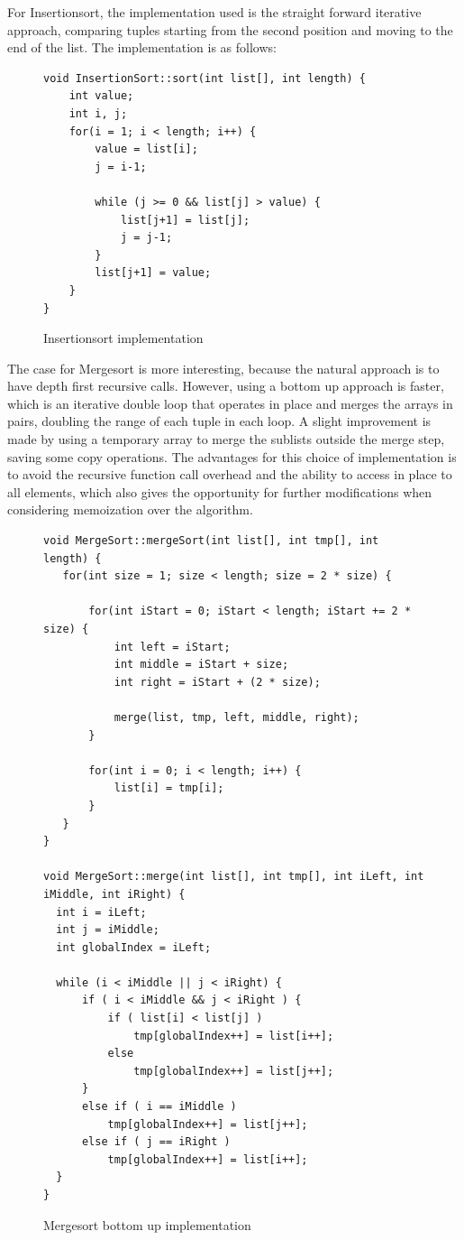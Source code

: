 \documentclass[a4paper,12pt]{article}
\begin{document}
For Insertionsort, the implementation used is the straight forward iterative approach, comparing tuples starting from the second position and moving to the end of the list. The implementation is as follows:

\begin{figure}[H]
\begin{small}
\begin{verbatim}
void InsertionSort::sort(int list[], int length) {
    int value;
    int i, j;
    for(i = 1; i < length; i++) {
        value = list[i];
        j = i-1;
        
        while (j >= 0 && list[j] > value) {
            list[j+1] = list[j];
            j = j-1;
        }
        list[j+1] = value;
    }
}
\end{verbatim}
\end{small}
\caption{Insertionsort implementation}
\end{figure}


The case for Mergesort is more interesting, because the natural approach is to have depth first recursive calls. However, using a bottom up approach is faster, which is an iterative double loop that operates in place and merges the arrays in pairs, doubling the range of each tuple in each loop. A slight improvement is made by using a temporary array to merge the sublists outside the merge step, saving some copy operations. The advantages for this choice of implementation is to avoid the recursive function call overhead and the ability to access in place to all elements, which also gives the opportunity for further modifications when considering memoization over the algorithm.

\begin{figure}[H]
\begin{small}
\begin{verbatim}
void MergeSort::mergeSort(int list[], int tmp[], int length) {
   for(int size = 1; size < length; size = 2 * size) { 

       for(int iStart = 0; iStart < length; iStart += 2 * size) {
           int left = iStart;
           int middle = iStart + size;
           int right = iStart + (2 * size);

           merge(list, tmp, left, middle, right);
       }
       
       for(int i = 0; i < length; i++) {
           list[i] = tmp[i];
       }
   }
}

void MergeSort::merge(int list[], int tmp[], int iLeft, int iMiddle, int iRight) {
  int i = iLeft;
  int j = iMiddle;
  int globalIndex = iLeft;

  while (i < iMiddle || j < iRight) {
      if ( i < iMiddle && j < iRight ) {
          if ( list[i] < list[j] )
              tmp[globalIndex++] = list[i++];
          else
              tmp[globalIndex++] = list[j++];
      }
      else if ( i == iMiddle )
          tmp[globalIndex++] = list[j++];
      else if ( j == iRight )
          tmp[globalIndex++] = list[i++];
  }
}
\end{verbatim}
\end{small}
\caption{Mergesort bottom up implementation}
\end{figure}
\end{document}
